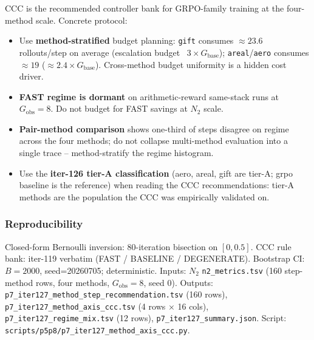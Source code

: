 CCC is the recommended controller bank for GRPO-family training at
the four-method scale.  Concrete protocol:
\begin{itemize}
\item Use \textbf{method-stratified} budget planning: \texttt{gift}
  consumes $\approx 23.6$ rollouts/step on average (escalation budget
  ~$3\times G_{\mathrm{base}}$); \texttt{areal}/\texttt{aero} consumes
  $\approx 19$ ($\approx 2.4\times G_{\mathrm{base}}$).  Cross-method
  budget uniformity is a hidden cost driver.
\item \textbf{FAST regime is dormant} on arithmetic-reward same-stack
  runs at $G_{\mathrm{obs}}{=}8$.  Do not budget for FAST savings
  at $N_2$ scale.
\item \textbf{Pair-method comparison} shows one-third of steps
  disagree on regime across the four methods; do not collapse
  multi-method evaluation into a single trace -- method-stratify
  the regime histogram.
\item Use the \textbf{iter-126 tier-A classification} (aero, areal,
  gift are tier-A; grpo baseline is the reference) when reading
  the CCC recommendations: tier-A methods are the population the
  CCC was empirically validated on.
\end{itemize}

\subsubsection*{Reproducibility}

Closed-form Bernoulli inversion: $80$-iteration bisection on
$[0, 0.5]$.  CCC rule bank: iter-119 verbatim (FAST / BASELINE /
DEGENERATE).  Bootstrap CI: $B=2000$, seed=20260705; deterministic.
Inputs: $N_2$ \texttt{n2\_metrics.tsv} (160 step-method rows,
four methods, $G_{\mathrm{obs}}{=}8$, seed 0).  Outputs:
\texttt{p7\_iter127\_method\_step\_recommendation.tsv}
(160 rows), \texttt{p7\_iter127\_method\_axis\_ccc.tsv}
(4 rows $\times$ 16 cols), \texttt{p7\_iter127\_regime\_mix.tsv}
(12 rows), \texttt{p7\_iter127\_summary.json}.  Script:
\texttt{scripts/p5p8/p7\_iter127\_method\_axis\_ccc.py}.
